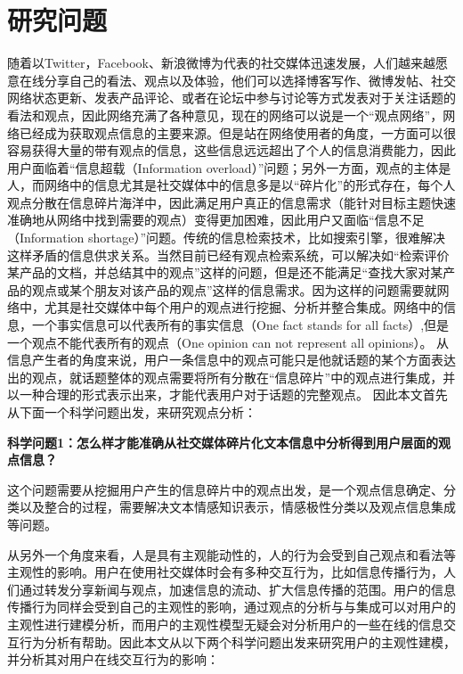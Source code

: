 \section{研究问题}
\label{point}
随着以Twitter，Facebook、新浪微博为代表的社交媒体迅速发展，人们越来越愿意在线分享自己的看法、观点以及体验，他们可以选择博客写作、微博发帖、社交网络状态更新、发表产品评论、或者在论坛中参与讨论等方式发表对于关注话题的看法和观点，因此网络充满了各种意见，现在的网络可以说是一个“观点网络”，网络已经成为获取观点信息的主要来源。但是站在网络使用者的角度，一方面可以很容易获得大量的带有观点的信息，这些信息远远超出了个人的信息消费能力，因此用户面临着“信息超载（Information overload）”问题；另外一方面，观点的主体是人，而网络中的信息尤其是社交媒体中的信息多是以“碎片化”的形式存在，每个人观点分散在信息碎片海洋中，因此满足用户真正的信息需求（能针对目标主题快速准确地从网络中找到需要的观点）变得更加困难，因此用户又面临“信息不足（Information shortage）”问题。传统的信息检索技术，比如搜索引擎，很难解决这样矛盾的信息供求关系。当然目前已经有观点检索系统，可以解决如“检索评价某产品的文档，并总结其中的观点”这样的问题，但是还不能满足“查找大家对某产品的观点或某个朋友对该产品的观点”这样的信息需求。因为这样的问题需要就网络中，尤其是社交媒体中每个用户的观点进行挖掘、分析并整合集成。网络中的信息，一个事实信息可以代表所有的事实信息（One fact stands for all facts）,但是一个观点不能代表所有的观点（One opinion can not represent all opinions）。
从信息产生者的角度来说，用户一条信息中的观点可能只是他就话题的某个方面表达出的观点，就话题整体的观点需要将所有分散在“信息碎片”中的观点进行集成，并以一种合理的形式表示出来，才能代表用户对于话题的完整观点。
因此本文首先从下面一个科学问题出发，来研究观点分析：

\textbf{科学问题1：怎么样才能准确从社交媒体碎片化文本信息中分析得到用户层面的观点信息？}

这个问题需要从挖掘用户产生的信息碎片中的观点出发，是一个观点信息确定、分类以及整合的过程，需要解决文本情感知识表示，情感极性分类以及观点信息集成等问题。

从另外一个角度来看，人是具有主观能动性的，人的行为会受到自己观点和看法等主观性的影响。用户在使用社交媒体时会有多种交互行为，比如信息传播行为，人们通过转发分享新闻与观点，加速信息的流动、扩大信息传播的范围。用户的信息传播行为同样会受到自己的主观性的影响，通过观点的分析与与集成可以对用户的主观性进行建模分析，而用户的主观性模型无疑会对分析用户的一些在线的信息交互行为分析有帮助。因此本文从以下两个科学问题出发来研究用户的主观性建模，并分析其对用户在线交互行为的影响：

